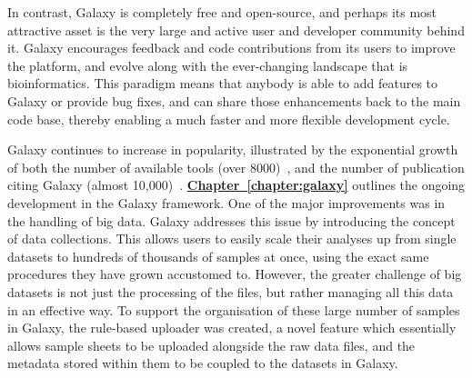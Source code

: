 In contrast, Galaxy is completely free and open-source, and perhaps its most attractive asset is the very large and active user and developer community behind it. Galaxy encourages feedback and code contributions from its users to improve the platform, and evolve along with the ever-changing landscape that is bioinformatics. This paradigm means that anybody is able to add features to Galaxy or provide bug fixes, and can share those enhancements back to the main code base, thereby enabling a much faster and more flexible development cycle.

Galaxy continues to increase in popularity, illustrated by the exponential growth of both the number of available tools (over 8000)~\cite{galaxytoolshed}, and the number of publication citing Galaxy (almost 10,000)~\cite{url-zotero-galaxy}.
\hyperref[chapter:galaxy]{\textbf{Chapter~\ref{chapter:galaxy}}} outlines the ongoing development in the Galaxy framework. One of the major improvements was in the handling of big data. Galaxy addresses this issue by introducing the concept of data collections. This allows users to easily scale their analyses up from single datasets to hundreds of thousands of samples at once, using the exact same procedures they have grown accustomed to.
However, the greater challenge of big datasets is not just the processing of the files, but rather managing all this data in an effective way.
To support the organisation of these large number of samples in Galaxy, the rule-based uploader was created, a novel feature which essentially allows sample sheets to be uploaded alongside the raw data files, and the metadata stored within them to be coupled to the datasets in Galaxy.

